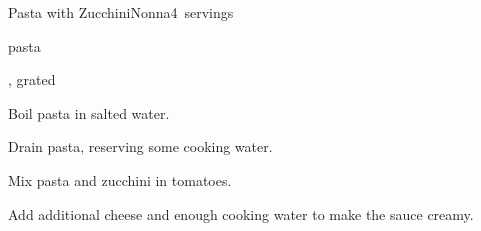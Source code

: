 \begin{recipe}{Pasta with Zucchini}{Nonna}{4~servings}

\begin{ingredients}
\item {} pasta
\item {} 
\item {}, grated
\end{ingredients}

\begin{directions}
\item Boil pasta in salted water.
\item Drain pasta, reserving some cooking water.
\item Mix pasta and zucchini in tomatoes.
\item Add additional cheese and enough cooking water to make the sauce creamy.
\end{directions}

\end{recipe}
